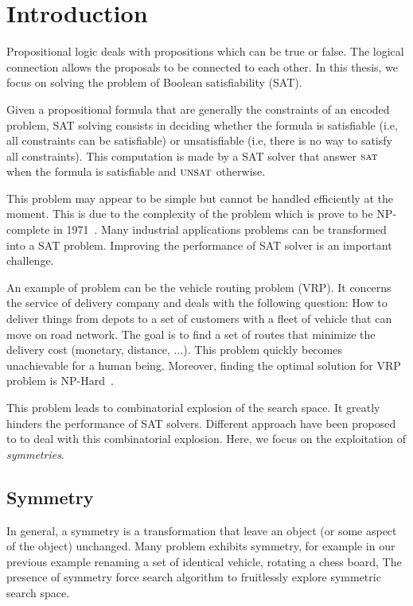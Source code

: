 \chapter{Introduction}\label{chap:intro}



Propositional logic deals with propositions which can be true or false.
The logical connection allows the proposals to be connected to each other.
In this thesis, we focus on solving the problem of Boolean satisfiability (SAT).

Given a propositional formula that are generally the constraints of an encoded problem,
SAT solving consists in deciding whether the formula is satisfiable (i.e, all constraints can be
satisfiable) or unsatisfiable (i.e, there is no way to satisfy all constraints).
This computation is made by a SAT solver that answer $\textsc{sat}$ when the formula is satisfiable
and $\textsc{unsat}$ otherwise.

This problem may appear to be simple but cannot be handled efficiently
at the moment. This is due to the complexity of the problem which is prove to be NP-complete in 1971~\cite{cook1971complexity}. Many industrial applications problems can be transformed into a SAT problem.
Improving the performance of SAT solver is an important challenge.


An example of problem can be the vehicle routing problem (VRP).
It concerns the service of delivery company and deals with the following question:
How to deliver things from depots to a set of customers with a fleet of vehicle that can move on road network.
The goal is to find a set of routes that minimize the delivery cost (monetary, distance, ...).
This problem quickly becomes unachievable for a human being. Moreover, 
finding the optimal solution for VRP problem is NP-Hard~\cite{toth2002vehicle}.


This problem leads to combinatorial explosion of the search space.
It greatly hinders the performance of SAT solvers.
Different approach have been proposed to to deal with this combinatorial explosion.
Here, we focus on the exploitation of \textit{symmetries}. 


\section{Symmetry}

In general, a symmetry is a transformation that leave an object (or some aspect of the object) unchanged.
Many problem exhibits symmetry, for example in our previous example renaming a set of identical vehicle,
rotating a chess board, 
The presence of symmetry force search algorithm to fruitlessly explore symmetric search space.


